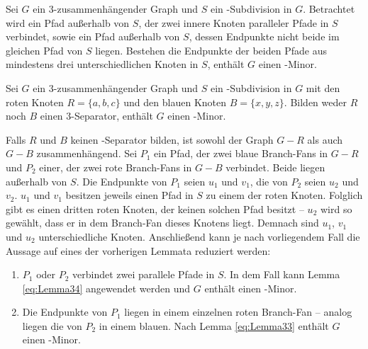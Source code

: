 \begin{lemma}\label{eq:Lemma34}
  Sei $G$ ein $3$-zusammenhängender Graph und $S$ ein \kdd-Subdivision in $G$.
  Betrachtet wird ein Pfad außerhalb von $S$, der zwei innere Knoten paralleler Pfade in $S$ verbindet, sowie ein Pfad außerhalb von $S$, dessen Endpunkte nicht beide im gleichen Pfad von $S$ liegen.
  Bestehen die Endpunkte der beiden Pfade aus mindestens drei unterschiedlichen Knoten in $S$, enthält $G$ einen \kf-Minor.
\end{lemma}

\begin{lemma}\label{eq:Lemma35}
  Sei $G$ ein $3$-zusammenhängender Graph und $S$ ein \kdd-Subdivision in $G$ mit den roten Knoten $R = \{a, b, c\}$ und den blauen Knoten $B = \{x, y, z\}$.
  Bilden weder $R$ noch $B$ einen $3$-Separator, enthält $G$ einen \kf-Minor.
\end{lemma}
\begin{beweis}
  Falls $R$ und $B$ keinen \dd-Separator bilden, ist sowohl der Graph $G - R$ als auch $G - B$ zusammenhängend.
  Sei $P_1$ ein Pfad, der zwei blaue Branch-Fans in $G - R$ und $P_2$ einer, der zwei rote Branch-Fans in $G - B$ verbindet.
  Beide liegen außerhalb von $S$.
  Die Endpunkte von $P_1$ seien $u_1$ und $v_1$, die von $P_2$ seien $u_2$ und $v_2$.
  $u_1$ und $v_1$ besitzen jeweils einen Pfad in $S$ zu einem der roten Knoten.
  Folglich gibt es einen dritten roten Knoten, der keinen solchen Pfad besitzt -- $u_2$ wird so gewählt, dass er in dem Branch-Fan dieses Knotens liegt.
  Demnach sind $u_1$, $v_1$ und $u_2$ unterschiedliche Knoten.
  Anschließend kann je nach vorliegendem Fall die Aussage auf eines der vorherigen Lemmata reduziert werden:
  \begin{enumerate}
    \item $P_1$ oder $P_2$ verbindet zwei parallele Pfade in $S$.
          In dem Fall kann Lemma \ref{eq:Lemma34} angewendet werden und $G$ enthält einen \kf-Minor.
    \item Die Endpunkte von $P_1$ liegen in einem einzelnen roten Branch-Fan -- analog liegen die von $P_2$ in einem blauen.
          Nach Lemma \ref{eq:Lemma33} enthält $G$ einen \kf-Minor.
  \end{enumerate}
\end{beweis}

